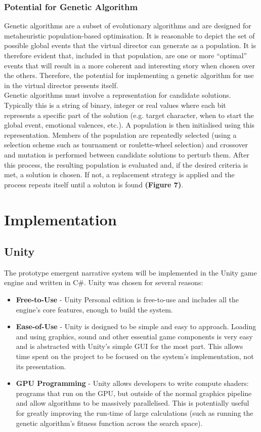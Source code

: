 \documentclass{sig-alternate-05-2015}
\begin{document}
\subsubsection{Potential for Genetic Algorithm}

\noindent Genetic algorithms are a subset of evolutionary algorithms and are designed for metaheuristic population-based optimisation. It is reasonable to depict the set of possible global events that the virtual director can generate as a population. It is therefore evident that, included in that population, are one or more ``optimal'' events that will result in a more coherent and interesting story when chosen over the others. Therefore, the potential for implementing a genetic algorithm for use in the virtual director presents itself.\\

Genetic algorithms must involve a representation for candidate solutions. Typically this is a string of binary, integer  or real values where each bit represents a specific part of the solution (e.g. target character, when to start the global event, emotional valences, etc.). A population is then initialised using this representation. Members of the population are repeatedly selected (using a selection scheme such as tournament or roulette-wheel selection) and crossover and mutation is performed between candidate solutions to perturb them. After this process, the resulting population is evaluated and, if the desired criteria is met, a solution is chosen. If not, a replacement strategy is applied and the process repeats itself until a soluton is found \textbf{(Figure 7)}.

\section{Implementation}
\subsection{Unity}

\noindent The prototype emergent narrative system will be implemented in the Unity game engine and written in C\#. Unity was chosen for several reasons:
\begin{itemize}
	\item \textbf{Free-to-Use} - Unity Personal edition is free-to-use and includes all the engine's core features, enough to build the system.
	\item \textbf{Ease-of-Use} - Unity is designed to be simple and easy to approach. Loading and using graphics, sound and other essential game components is very easy and is abstracted with Unity's simple GUI for the most part. This allows time spent on the project to be focused on the system's implementation, not its presentation.
	\item \textbf{GPU Programming} - Unity allows developers to write compute shaders: programs that run on the GPU, but outside of the normal graphics pipeline and allow algorithms to be massively parallelised. This is potentially useful for greatly improving the run-time of large calculations (such as running the genetic algorithm's fitness function across the search space).
\end{itemize}
\end{document}
